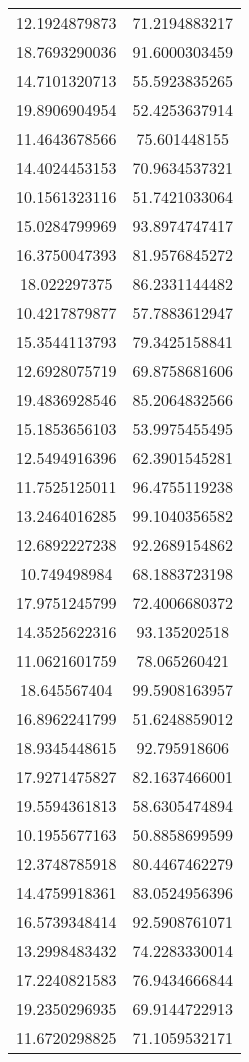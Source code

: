 \begin{table}
\begin{tabular}{cc}
12.1924879873 & 71.2194883217 \\
18.7693290036 & 91.6000303459 \\
14.7101320713 & 55.5923835265 \\
19.8906904954 & 52.4253637914 \\
11.4643678566 & 75.601448155 \\
14.4024453153 & 70.9634537321 \\
10.1561323116 & 51.7421033064 \\
15.0284799969 & 93.8974747417 \\
16.3750047393 & 81.9576845272 \\
18.022297375 & 86.2331144482 \\
10.4217879877 & 57.7883612947 \\
15.3544113793 & 79.3425158841 \\
12.6928075719 & 69.8758681606 \\
19.4836928546 & 85.2064832566 \\
15.1853656103 & 53.9975455495 \\
12.5494916396 & 62.3901545281 \\
11.7525125011 & 96.4755119238 \\
13.2464016285 & 99.1040356582 \\
12.6892227238 & 92.2689154862 \\
10.749498984 & 68.1883723198 \\
17.9751245799 & 72.4006680372 \\
14.3525622316 & 93.135202518 \\
11.0621601759 & 78.065260421 \\
18.645567404 & 99.5908163957 \\
16.8962241799 & 51.6248859012 \\
18.9345448615 & 92.795918606 \\
17.9271475827 & 82.1637466001 \\
19.5594361813 & 58.6305474894 \\
10.1955677163 & 50.8858699599 \\
12.3748785918 & 80.4467462279 \\
14.4759918361 & 83.0524956396 \\
16.5739348414 & 92.5908761071 \\
13.2998483432 & 74.2283330014 \\
17.2240821583 & 76.9434666844 \\
19.2350296935 & 69.9144722913 \\
11.6720298825 & 71.1059532171 \\

\end{tabular}
\end{table}
